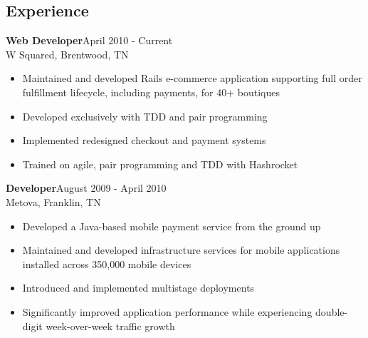 \documentclass[line, margin, 10pt]{res}
\begin{document}

\renewcommand{\namefont}{ \LARGE \bf }

\address{elizabrock@gmail.com}
\address{(858) 205-9285}

\begin{resume}
\section{Experience}


{\bf Web Developer}\hfill April 2010 - Current\\
W Squared, Brentwood, TN
\begin{itemize} \itemsep -2pt
\item Maintained and developed Rails e-commerce application supporting full order fulfillment lifecycle, including payments, for 40+ boutiques
\item Developed exclusively with TDD and pair programming
\item Implemented redesigned checkout and payment systems
\item Trained on agile, pair programming and TDD with Hashrocket
\end{itemize}

{\bf Developer}\hfill August 2009 - April 2010\\
Metova, Franklin, TN
\begin{itemize} \itemsep -2pt
\item Developed a Java-based mobile payment service from the ground up
\item Maintained and developed infrastructure services for mobile applications installed across 350,000 mobile devices
\item Introduced and implemented multistage deployments
\item Significantly improved application performance while experiencing double-digit week-over-week traffic growth
\end{itemize}


\end{resume}
\end{document}

